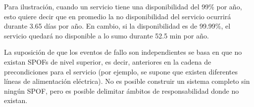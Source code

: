 Para ilustración, cuando un servicio tiene una disponibilidad del 99\% por año, esto quiere decir que en promedio la no disponibilidad del servicio ocurrirá durante 3.65 días por año. En cambio, si la disponibilidad es de 99.99\%, el servicio quedará no disponible a lo sumo durante 52.5 min por año.

La suposición de que los eventos de fallo son independientes se basa en que no existan SPOFs de nivel superior, es decir, anteriores en la cadena de precondiciones para el servicio (por ejemplo, se supone que existen diferentes líneas de alimentación eléctrica). No es posible construir un sistema completo sin ningún SPOF, pero es posible delimitar ámbitos de responsabilidad donde no existan.


% 
